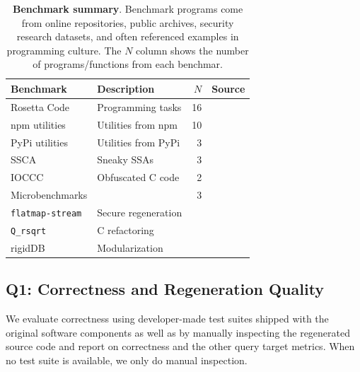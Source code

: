 \documentclass[noacm,sigplan,review]{acmart}
\newcommand{\ttt}[1]{\texttt{#1}\xspace}
\begin{document}
\begin{table}[h]
\centering
  \caption{\textbf{Benchmark summary}. 
  Benchmark programs come from online repositories, public archives, security research datasets, and often referenced examples in programming culture.
  The $N$ column shows the number of programs/functions from each benchmar.
  }
\begin{tabular}{llrl}
\toprule
Benchmark                          & Description         & $N$ & Source \\
\midrule
Rosetta Code                       & Programming tasks   & 16   & \cite{rosettacode} \\
npm utilities                      & Utilities from npm  & 10  & \cite{regbench2025} \\
PyPi utilities                   & Utilities from PyPi & 3   & \cite{regbench2025} \\
SSCA                               & Sneaky SSAs         & 3   & \cite{ev:eurosec:2022, ohm2020backstabber,copeland2019frightening} \\
IOCCC                              & Obfuscated C code   & 2   & \cite{ioccc} \\
Microbenchmarks                    &                     & 3   & \\
\hspace{.5em} \ttt{flatmap-stream} & Secure regeneration &     & \cite{es1}  \\
\hspace{.5em} \ttt{Q\_rsqrt}       & C refactoring       &     & \cite{fast_inv_sqrt}  \\
\hspace{.5em} \textsf{rigidDB}     & Modularization      &     & \cite{codewithsadeemusicplayer} \\
\bottomrule
\end{tabular}
\label{tab:benchmarks}
\end{table}

\subsection{Q1: Correctness and Regeneration Quality}

We evaluate correctness using developer-made test suites 
shipped with the original software components as well as by manually inspecting
the regenerated source code and report on correctness and the other query target metrics.
When no test suite is available, we only do manual inspection.
\end{document}
